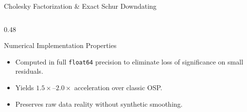\documentclass[aspectratio=169, 10pt]{beamer}
\begin{document}
\begin{frame}{Cholesky Factorization \& Exact Schur Downdating}
\begin{columns}[T]
\begin{column}{0.48\textwidth}
      \begin{block}{Numerical Implementation Properties}
        \footnotesize
        \begin{itemize}\setlength{\itemsep}{1pt}
          \item Computed in full \texttt{float64} precision to eliminate loss of significance on small residuals.
          \item Yields $1.5\times\text{--}2.0\times$ acceleration over classic OSP.
          \item Preserves raw data reality without synthetic smoothing.
        \end{itemize}
      \end{block}
    \end{column}
  \end{columns}
\end{frame}
\end{document}
